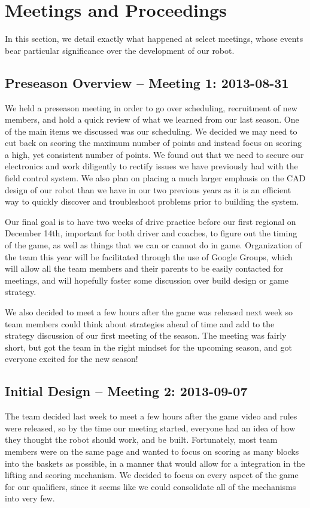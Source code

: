 \section{Meetings and Proceedings}
In this section, we detail exactly what happened at select meetings, whose events bear particular significance over the development of our robot.

\subsection{Preseason Overview -- Meeting 1: 2013-08-31}
We held a preseason meeting in order to go over scheduling, recruitment of new members, and hold a quick review of what we learned from our last season. One of the main items we discussed was our scheduling. We decided we may need to cut back on scoring the maximum number of points and instead focus on scoring a high, yet consistent number of points. We found out that we need to secure our electronics and work diligently to rectify issues we have previously had with the field control system. We also plan on placing a much larger emphasis on the CAD design of our robot than we have in our two previous years as it is an efficient way to quickly discover and troubleshoot problems prior to building the system. 

Our final goal is to have two weeks of drive practice before our first regional on December 14th, important for both driver and coaches, to figure out the timing of the game, as well as things that we can or cannot do in game. Organization of the team this year will be facilitated through the use of Google Groups, which will allow all the team members and their parents to be easily contacted for meetings, and will hopefully foster some discussion over build design or game strategy. 

We also decided to meet a few hours after the game was released next week so team members could think about strategies ahead of time and add to the strategy discussion of our first meeting of the season. The meeting was fairly short, but got the team in the right mindset for the upcoming season, and got everyone excited for the new season!

\newpage \subsection{Initial Design -- Meeting 2: 2013-09-07}
The team decided last week to meet a few hours after the game video and rules were released, so by the time our meeting started, everyone had an idea of how they thought the robot should work, and be built. Fortunately, most team members were on the same page and wanted to focus on scoring as many blocks into the baskets as possible, in a manner that would allow for a integration in the lifting and scoring mechanism. We decided to focus on every aspect of the game for our qualifiers, since it seems like we could consolidate all of the mechanisms into very few.


